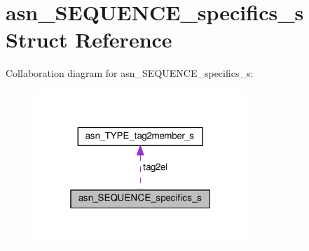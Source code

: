 \hypertarget{structasn__SEQUENCE__specifics__s}{}\section{asn\+\_\+\+S\+E\+Q\+U\+E\+N\+C\+E\+\_\+specifics\+\_\+s Struct Reference}
\label{structasn__SEQUENCE__specifics__s}


Collaboration diagram for asn\+\_\+\+S\+E\+Q\+U\+E\+N\+C\+E\+\_\+specifics\+\_\+s\+:\nopagebreak
\begin{figure}[H]
\begin{center}
\leavevmode
\includegraphics[width=229pt]{structasn__SEQUENCE__specifics__s__coll__graph}
\end{center}
\end{figure}
